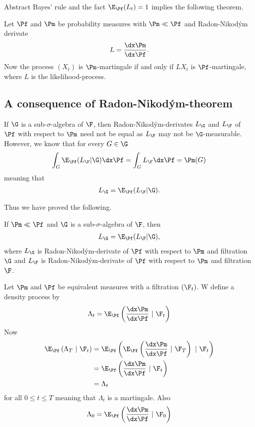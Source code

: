 Abstract Bayes' rule and the fact $\E_{\Pf} (L_t) = 1$ implies the following theorem.

\begin{thm}
	Let $\Pf$ and $\Pm$ be probability measures with $\Pm \ll \Pf$ and Radon-Nikod\'{y}m derivate
	\begin{align}
	L = \frac{ \dx \Pm }{ \dx \Pf } .
	\end{align}
	Now the process $(X_t)$ is $\Pm$-martingale if and only if $LX_t$ is $\Pf$-martingale, where $L$ is the likelihood-process.
\end{thm}

\subsection{A consequence of Radon-Nikod\'{y}m-theorem}

If $\G$ is a sub-$\sigma$-algebra of $\F$, then Radon-Nikod\'{y}m-derivates $L_{\G}$ and $L_{\F}$ of $\Pf$ with respect to $\Pm$ need not be equal as $L_{\F}$ may not be $\G$-measurable. However, we know that for every $G \in \G$
\begin{align}
\int_G \E_{\Pf} ( L_{\F} | \G ) \dx \Pf = \int_G L_{\F} \dx \Pf = \Pm (G)
\end{align}
meaning that 
\begin{align}
L_{\G} = \E_{\Pf} ( L_{\F} | \G ) .
\end{align}

Thus we have proved the following.

\begin{lemma}
	If $\Pm \ll \Pf$ and $\G$ is a sub-$\sigma$-algebra of $\F$, then
	\begin{align}
	\label{Radon-Nikodymderivateconditional}
	L_{\G} = \E_{\Pf} ( L_{\F} | \G ) ,
	\end{align}
	where $L_{\G}$ is Radon-Nikod\'{y}m-derivate of $\Pf$ with respect to $\Pm$ and filtration $\G$ and $L_{\F}$ is Radon-Nikod\'{y}m-derivate of $\Pf$ with respect to $\Pm$ and filtration $\F$.
\end{lemma}

Let $\Pm$ and $\Pf$ be equivalent measures with a filtration $(\F_t)$. W define a density process by
\begin{align}
\Lambda_t = \E_{\Pf} \left( \frac{\dx \Pm}{\dx \Pf} \ | \ \F_t \right)
\end{align}
Now	
\begin{align}
\E_{\Pf} \left( \Lambda_T \ | \ \F_t \right) &= \E_{\Pf} \left( \E_{\Pf} \left( \frac{\dx \Pm}{\dx \Pf} \ | \ \F_T \right) \ | \ \F_t \right) \\
&= \E_{\Pf} \left( \frac{\dx \Pm}{\dx \Pf} \ | \ \F_t \right) \\
&= \Lambda_t
\end{align}
for all $0 \leq t \leq T$ meaning that $\Lambda_t$ is a martingale. Also
\begin{align}
\Lambda_0 = \E_{\Pf} \left( \frac{\dx \Pm}{\dx \Pf} \ | \ \F_0 \right)
\end{align}	